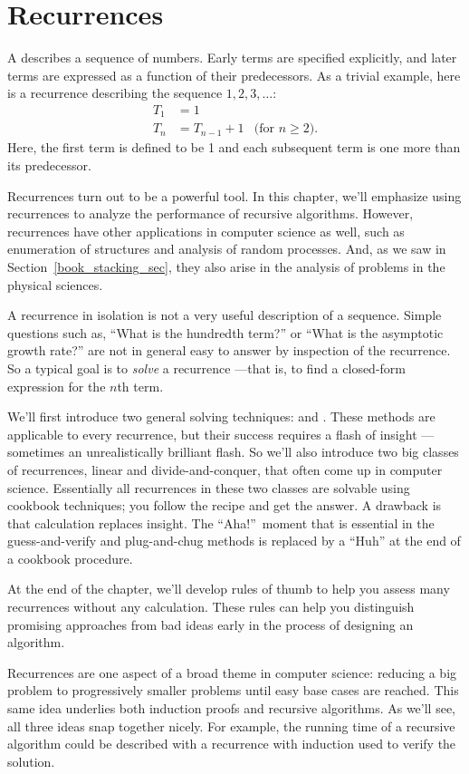 \part{Recurrences}\label{part:recurrences}

\partintro
{}

A  describes a sequence of numbers.  Early terms are
specified explicitly, and later terms are expressed as a function of
their predecessors.  As a trivial example, here is a recurrence describing
the sequence $1, 2, 3,\dots$:
\begin{align*}
T_1 & = 1 \\
T_n & = T_{n-1} + 1 & \text{(for $n \geq 2$)}.
\end{align*}
Here, the first term is defined to be 1 and each subsequent term is
one more than its predecessor.

Recurrences turn out to be a powerful tool.  In this chapter, we'll
emphasize using recurrences to analyze the performance of recursive
algorithms.  However, recurrences have other applications in computer
science as well, such as enumeration of structures and analysis of
random processes.  And, as we saw in Section~\ref{book_stacking_sec},
they also arise in the analysis of problems in the physical sciences.

A recurrence in isolation is not a very useful description of a
sequence.  Simple questions such as, ``What is the hundredth term?''
or ``What is the asymptotic growth rate?''  are not in general easy to
answer by inspection of the recurrence.  So a typical goal is to
\emph{solve} a recurrence ---that is, to find a closed-form expression
for the $n$th term.

We'll first introduce two general solving techniques:
 and .  These methods are
applicable to every recurrence, but their success requires a flash of
insight ---sometimes an unrealistically brilliant flash.  So we'll
also introduce two big classes of recurrences, linear and
divide-and-conquer, that often come up in computer science.
Essentially all recurrences in these two classes are solvable using
cookbook techniques; you follow the recipe and get the answer.  A
drawback is that calculation replaces insight.  The ``Aha!''\ moment
that is essential in the guess-and-verify and plug-and-chug methods is
replaced by a ``Huh'' at the end of a cookbook procedure.

At the end of the chapter, we'll develop rules of thumb to help you
assess many recurrences without any calculation.  These rules can help
you distinguish promising approaches from bad ideas early in the
process of designing an algorithm.

Recurrences are one aspect of a broad theme in computer science:
reducing a big problem to progressively smaller problems until easy
base cases are reached.  This same idea underlies both induction
proofs and recursive algorithms.  As we'll see, all three ideas snap
together nicely.  For example, the running time of a recursive
algorithm could be described with a recurrence with induction used to
verify the solution.

\endinput
